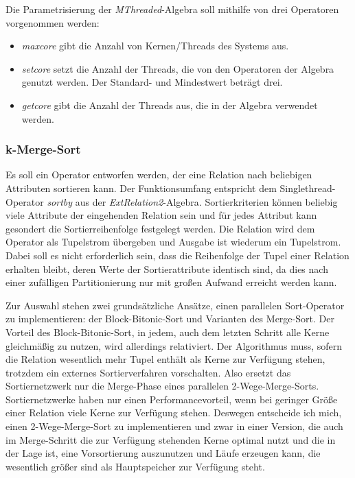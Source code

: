 \documentclass[a4paper,12pt,twoside]{article}
\newcommand{\Fb}[1]{\textit{#1}} %
\begin{document}
Die Parametrisierung der \Fb{MThreaded}-Algebra soll mithilfe von drei Operatoren vorgenommen werden:

\begin{itemize}
	\item \Fb{maxcore} gibt die Anzahl von Kernen/Threads des Systems aus.
	\item \Fb{setcore} setzt die Anzahl der Threads, die von den Operatoren der Algebra genutzt werden. Der Standard- und Mindestwert beträgt drei.
	\item \Fb{getcore} gibt die Anzahl der Threads aus, die in der Algebra verwendet werden.
\end{itemize}

\subsubsection{k-Merge-Sort}
\label{entw:sort}

Es soll ein Operator entworfen werden, der eine Relation nach beliebigen Attributen sortieren kann. Der Funktionsumfang entspricht dem Singlethread-Operator \Fb{sortby} aus der \Fb{ExtRelation2}-Algebra. Sortierkriterien können beliebig viele Attribute der eingehenden Relation sein und für jedes Attribut kann gesondert die Sortierreihenfolge festgelegt werden. Die Relation wird dem Operator als Tupelstrom übergeben und Ausgabe ist wiederum ein Tupelstrom. Dabei soll es nicht erforderlich sein, dass die Reihenfolge der Tupel einer Relation erhalten bleibt, deren Werte der Sortierattribute identisch sind, da dies nach einer zufälligen Partitionierung nur mit großen Aufwand erreicht werden kann.

Zur Auswahl stehen zwei grundsätzliche Ansätze, einen parallelen Sort-Operator zu implementieren: der Block-Bitonic-Sort und Varianten des Merge-Sort. Der Vorteil des Block-Bitonic-Sort, in jedem, auch dem letzten Schritt alle Kerne gleichmäßig zu nutzen, wird allerdings relativiert. Der Algorithmus muss, sofern die Relation wesentlich mehr Tupel enthält als Kerne zur Verfügung stehen, trotzdem ein externes Sortierverfahren vorschalten. Also ersetzt das Sortiernetzwerk nur die Merge-Phase eines parallelen 2-Wege-Merge-Sorts. Sortiernetzwerke haben nur einen Performancevorteil, wenn bei geringer Größe einer Relation viele Kerne zur Verfügung stehen. Deswegen entscheide ich mich, einen 2-Wege-Merge-Sort zu implementieren und zwar in einer Version, die auch im Merge-Schritt die zur Verfügung stehenden Kerne optimal nutzt und die in der Lage ist, eine Vorsortierung auszunutzen und Läufe erzeugen kann, die wesentlich größer sind als Hauptspeicher zur Verfügung steht.
\end{document}
